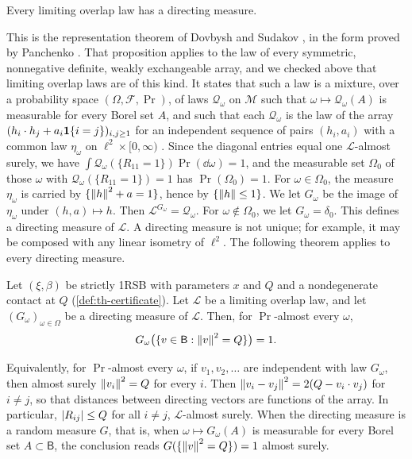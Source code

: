 \begin{theorem}\label{thm:dir-DS}
Every limiting overlap law has a directing measure.
\end{theorem}

This is the representation theorem of Dovbysh and Sudakov \cite{DovbyshSudakov1982}, in the form proved by Panchenko \cite[Proposition~1]{Panchenko2010DS}. That proposition applies to the law of every symmetric, nonnegative definite, weakly exchangeable array, and we checked above that limiting overlap laws are of this kind. It states that such a law is a mixture, over a probability space $(\Omega,\mathcal F,\Pr)$, of laws $\mathcal Q_\omega$ on $\mathcal M$ such that $\omega\mapsto\mathcal Q_\omega(A)$ is measurable for every Borel set $A$, and such that each $\mathcal Q_\omega$ is the law of the array $(h_i\cdot h_j+a_i\mathbf 1\{i=j\})_{i,j\ge1}$ for an independent sequence of pairs $(h_i,a_i)$ with a common law $\eta_\omega$ on $\ell^2\times[0,\infty)$ \cite[(1.1)--(1.2)]{Panchenko2010DS}. Since the diagonal entries equal one $\mathcal L$-almost surely, we have $\int\mathcal Q_\omega(\{R_{11}=1\})\Pr(\dd\omega)=1$, and the measurable set $\Omega_0$ of those $\omega$ with $\mathcal Q_\omega(\{R_{11}=1\})=1$ has $\Pr(\Omega_0)=1$. For $\omega\in\Omega_0$, the measure $\eta_\omega$ is carried by $\{\left\lVert h\right\rVert^2+a=1\}$, hence by $\{\left\lVert h\right\rVert\le1\}$. We let $G_\omega$ be the image of $\eta_\omega$ under $(h,a)\mapsto h$. Then $\mathcal L^{G_\omega}=\mathcal Q_\omega$. For $\omega\notin\Omega_0$, we let $G_\omega=\delta_0$. This defines a directing measure of $\mathcal L$. A directing measure is not unique; for example, it may be composed with any linear isometry of $\ell^2$. The following theorem applies to every directing measure.

\begin{theorem}\label{thm:dir-norm}
Let $(\xi,\beta)$ be strictly 1RSB with parameters $x$ and $Q$ and a nondegenerate contact at $Q$ (\cref{def:th-certificate}). Let $\mathcal L$ be a limiting overlap law, and let $(G_\omega)_{\omega\in\Omega}$ be a directing measure of $\mathcal L$. Then, for $\Pr$-almost every $\omega$,
\[
G_\omega\big(\{v\in\mathsf B:\left\lVert v\right\rVert^2=Q\}\big)=1.
\]
\end{theorem}

Equivalently, for $\Pr$-almost every $\omega$, if $v_1,v_2,\dots$ are independent with law $G_\omega$, then almost surely $\left\lVert v_i\right\rVert^2=Q$ for every $i$. Then $\left\lVert v_i-v_j\right\rVert^2=2(Q-v_i\cdot v_j)$ for $i\ne j$, so that distances between directing vectors are functions of the array. In particular, $\left|R_{ij}\right|\le Q$ for all $i\ne j$, $\mathcal L$-almost surely. When the directing measure is a random measure $G$, that is, when $\omega\mapsto G_\omega(A)$ is measurable for every Borel set $A\subset\mathsf B$, the conclusion reads $G(\{\left\lVert v\right\rVert^2=Q\})=1$ almost surely.

